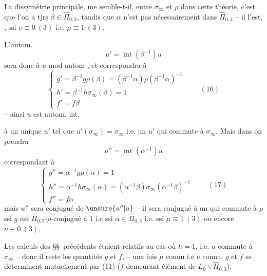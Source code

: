 La dissymétrie principale, me semble-t-il, entre $\sigma_\infty$ et $\rho$ dans cette théorie, c'est que  l'on a tjrs $\beta\in\widehat{\Pi}_{0,3}$, tandis que $\alpha$ n'est pas nécessairement dans $\widehat{\Pi}_{0,3}$ -- il l'est, , ssi $\nu\equiv0\ (3)$ i.e. $\mu\equiv1\ (3)$.

L'autom.
\[
u'=\operatorname{int}(\beta^{-1})u
\]
sera donc  à $u$ mod autom , et correspondra à
\[
\left\{\begin{array}{l}
g'=\beta^{-1}g\rho(\beta)=(\beta^{-1}\alpha)\rho(\beta^{-1}\alpha)^{-1}\\
h'=\beta^{-1}h\sigma_\infty(\beta)=1\\
f'=f\beta
\end{array}\right.
\qquad (16)
\]
-- ainsi $u$ est   autom. int.



à un unique $u'$ tel que $u'(\sigma_\infty)=\sigma_\infty$ i.e. un $u'$ qui commute à $\sigma_\infty$. Mais dans  on prendra
\[
u''=\operatorname{int}(\alpha^{-1})u
\]
correspondant à
\[
\left\{\begin{array}{l}
g''=\alpha^{-1}g\rho(\alpha)=1\\
h''=\alpha^{-1}h\sigma_\infty(\alpha)=(\alpha^{-1}\beta)\sigma_\infty(\alpha^{-1}\beta)^{-1}\\
f''=f\alpha
\end{array}\right.
\qquad (17)
\]
mais $u''$ sera conjugué  de $\unsure{u''|u}$ -- il sera conjugué à un   qui commute à $\rho$ ssi $g$ est $\Pi_{0,3}$-$\rho$-conjugué à $1$ i.e ssi $\alpha\in\widehat{\Pi}_{0,3}$ i.e. ssi $\mu\equiv1\ (3)$ ou encore $\nu\equiv0\ (3)$.

 Les calculs des \S\S\ précédents étaient relatifs au cas où $h=1$, i.e. $u$ commute à $\sigma_\infty$ -- donc  il reste les quantités $g$ et $f$,  
-- une fois $\mu$ connu i.e $\nu$ connu, $g$ et $f$ se déterminent mutuellement par (11) ($f$ demeurant élément de $L_0\backslash\widehat{\Pi}_{0,3}$).

